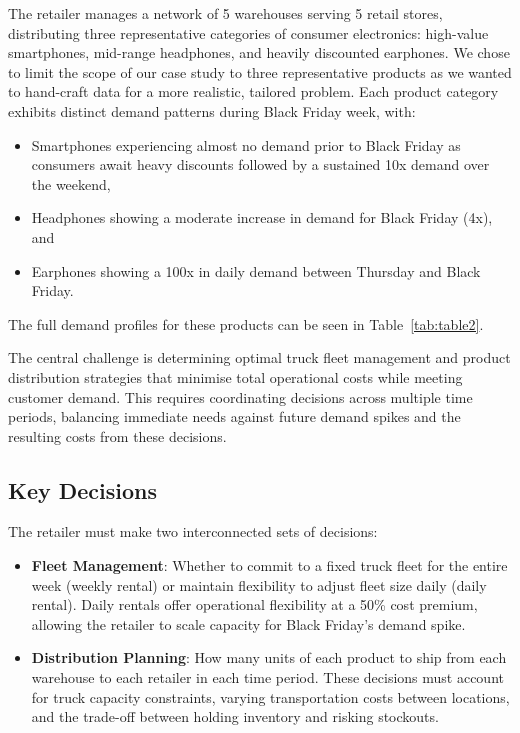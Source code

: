 \documentclass[a4paper,12pt]{article}
\begin{document}
The retailer manages a network of 5 warehouses serving 5 retail stores, distributing three representative categories of consumer electronics: high-value smartphones, mid-range headphones, and heavily discounted earphones.
We chose to limit the scope of our case study to three representative products as we wanted to hand-craft data for a more realistic, tailored problem.
Each product category exhibits distinct demand patterns during Black Friday week, with:

\begin{itemize}
    \item Smartphones experiencing almost no demand prior to Black Friday as consumers await heavy discounts followed by a sustained 10x demand over the weekend,
    \item Headphones showing a moderate increase in demand for Black Friday (4x), and
    \item Earphones showing a 100x in daily demand between Thursday and Black Friday.
\end{itemize}

The full demand profiles for these products can be seen in Table~\ref{tab:table2}.

The central challenge is determining optimal truck fleet management and product distribution strategies that minimise total operational costs while meeting customer demand.
This requires coordinating decisions across multiple time periods, balancing immediate needs against future demand spikes and the resulting costs from these decisions.

\subsection{Key Decisions}\label{subsec:key-decisions}

The retailer must make two interconnected sets of decisions:
\begin{itemize}
    \item \textbf{Fleet Management}: Whether to commit to a fixed truck fleet for the entire week (weekly rental) or maintain flexibility to adjust fleet size daily (daily rental).
Daily rentals offer operational flexibility at a 50\% cost premium, allowing the retailer to scale capacity for Black Friday's demand spike.

\item \textbf{Distribution Planning}: How many units of each product to ship from each warehouse to each retailer in each time period.
These decisions must account for truck capacity constraints, varying transportation costs between locations, and the trade-off between holding inventory and risking stockouts.
\end{itemize}
\end{document}

